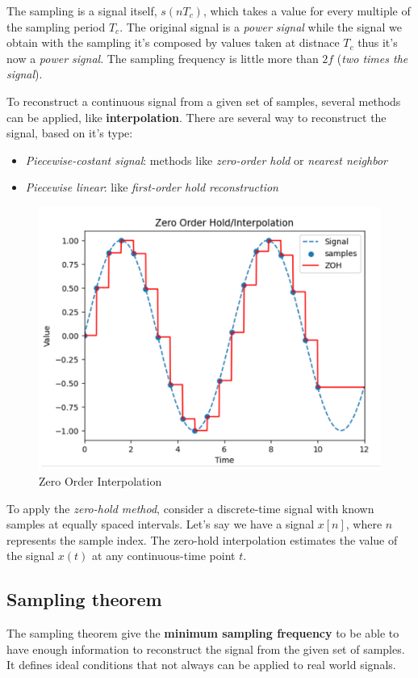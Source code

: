 \documentclass[10pt,a4paper]{report}
\theoremstyle{definition}
\begin{document}
The sampling is a signal itself, $s(nT_{c})$, which takes a value for every multiple of the sampling period $T_{c}$.
The original signal is a \textit{power signal} while the signal we obtain with the sampling it's composed by values taken at distnace $T_{c}$ thus it's now a \textit{power signal}.
The sampling frequency is little more than $2f$ (\textit{two times the signal}).

To reconstruct a continuous signal from a given set of samples, several methods can be applied, like \textbf{interpolation}. There are several way to reconstruct the signal, based on it's type:
\begin{itemize}
	\item 
	\textit{Piecewise-costant signal}: methods like \textit{zero-order hold} or \textit{nearest neighbor}
	\item 
	\textit{Piecewise linear}: like \textit{first-order hold reconstruction}
	
\end{itemize}
\begin{figure}[h!]
	\centering\includegraphics[scale=0.50]{images/Pasted image 20230526112203.png}
	\caption{Zero Order Interpolation}
\end{figure}

To apply the \textit{zero-hold method}, consider a discrete-time signal with known samples at equally spaced intervals. Let's say we have a signal $x[n]$,  where $n$ represents the sample index. The zero-hold interpolation estimates the value of the signal $x(t)$ at any continuous-time point $t$.


\subsection{Sampling theorem}\label{sec:sampling-theorem}
The sampling theorem give the \textbf{minimum sampling frequency} to be able to have enough information to reconstruct the signal from the given set of samples. It defines ideal conditions that not always can be applied to real world signals.
\end{document}
